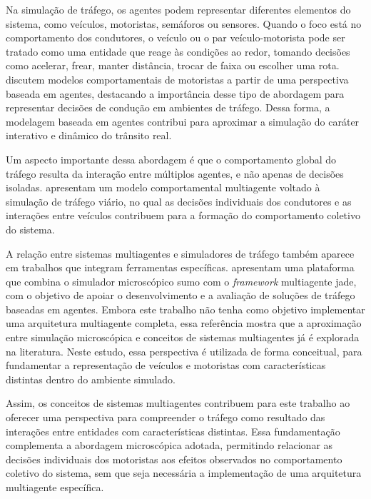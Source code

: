 Na simulação de tráfego, os agentes podem representar diferentes elementos do sistema, como veículos, motoristas, semáforos ou sensores. Quando o foco está no comportamento dos condutores, o veículo ou o par veículo-motorista pode ser tratado como uma entidade que reage às condições ao redor, tomando decisões como acelerar, frear, manter distância, trocar de faixa ou escolher uma rota.  discutem modelos comportamentais de motoristas a partir de uma perspectiva baseada em agentes, destacando a importância desse tipo de abordagem para representar decisões de condução em ambientes de tráfego. Dessa forma, a modelagem baseada em agentes contribui para aproximar a simulação do caráter interativo e dinâmico do trânsito real.

Um aspecto importante dessa abordagem é que o comportamento global do tráfego resulta da interação entre múltiplos agentes, e não apenas de decisões isoladas.  apresentam um modelo comportamental multiagente voltado à simulação de tráfego viário, no qual as decisões individuais dos condutores e as interações entre veículos contribuem para a formação do comportamento coletivo do sistema.

A relação entre sistemas multiagentes e simuladores de tráfego também aparece em trabalhos que integram ferramentas específicas.  apresentam uma plataforma que combina o simulador microscópico \gls{sumo} com o \textit{framework} multiagente \gls{jade}, com o objetivo de apoiar o desenvolvimento e a avaliação de soluções de tráfego baseadas em agentes. Embora este trabalho não tenha como objetivo implementar uma arquitetura multiagente completa, essa referência mostra que a aproximação entre simulação microscópica e conceitos de sistemas multiagentes já é explorada na literatura. Neste estudo, essa perspectiva é utilizada de forma conceitual, para fundamentar a representação de veículos e motoristas com características distintas dentro do ambiente simulado.

Assim, os conceitos de sistemas multiagentes contribuem para este trabalho ao oferecer uma perspectiva para compreender o tráfego como resultado das interações entre entidades com características distintas. Essa fundamentação complementa a abordagem microscópica adotada, permitindo relacionar as decisões individuais dos motoristas aos efeitos observados no comportamento coletivo do sistema, sem que seja necessária a implementação de uma arquitetura multiagente específica.

